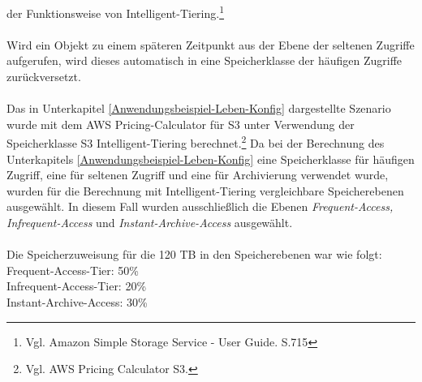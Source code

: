 der Funktionsweise von Intelligent-Tiering.\footnote{Vgl. Amazon Simple Storage Service - User Guide. S.715\cite{AMZ18}}
\\\\
Wird ein Objekt zu einem späteren Zeitpunkt aus der Ebene der seltenen Zugriffe aufgerufen, wird dieses automatisch in eine Speicherklasse der häufigen Zugriffe zurückversetzt.
\\\\
Das in Unterkapitel \ref{Anwendungsbeispiel-Leben-Konfig} dargestellte Szenario wurde mit dem AWS Pricing-Calculator für S3 unter Verwendung der Speicherklasse S3 Intelligent-Tiering berechnet.\footnote{Vgl.  AWS Pricing Calculator S3\cite{AMZ17-S3}.}%
Da bei der Berechnung des Unterkapitels \ref{Anwendungsbeispiel-Leben-Konfig} eine Speicherklasse für häufigen Zugriff, eine für seltenen Zugriff und eine für Archivierung verwendet wurde, wurden für die Berechnung mit Intelligent-Tiering vergleichbare Speicherebenen ausgewählt. In diesem Fall wurden ausschließlich die Ebenen \textit{Frequent-Access, Infrequent-Access} und \textit{Instant-Archive-Access} ausgewählt. %
\\\\
Die Speicherzuweisung für die 120 TB in den Speicherebenen war wie folgt:\\
Frequent-Access-Tier: 50\% \\
Infrequent-Access-Tier: 20\%\\
Instant-Archive-Access: 30\%
\\
